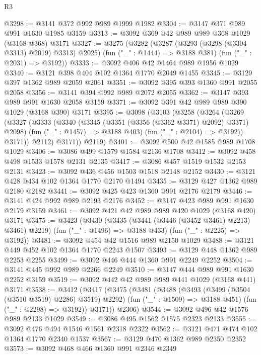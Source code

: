 \begin{lexlean}{R3}
\begin{coremodule}
@3298 := @3141 @372 @992 @989 @1999 @1982
@3304 := @3147 @371 @989 @991 @1630 @1985 @3159
@3313 := @3092 @369 @42 @989 @989 @368 @1029 (@3168 @368) @3171
@3327 := @3275
    (@3282
      (@3287 (@3293 (@3298 (@3304 @3313) @2019) @3313) @2025)
      (fun ("_" : @1444) => @3188 @381)
      (fun ("_" : @2031) => @3192))
@3333 := @3092 @406 @42 @1464 @989 @1956 @1029
@3340 := @3121 @398 @404 @102 @1364 @1770 @2049 @1455
@3345 := @3129 @397 @1362 @989 @2059 @2061
@3351 := @3092 @395 @393 @1360 @991 @2055 @2058
@3356 := @3141 @394 @992 @989 @2072 @2055
@3362 := @3147 @393 @989 @991 @1630 @2058 @3159
@3371 := @3092 @391 @42 @989 @989 @390 @1029 (@3168 @390) @3171
@3395 := @3098
    (@3103
      (@3258
        (@3264
          (@3269
            (@3327
              (@3333
                (@3340
                  (@3345 (@3351 (@3356 (@3362 @3371) @2092) @3371) @2098)
                  (fun ("_" : @1457) => @3188 @403)
                  (fun ("_" : @2104) => @3192))
                @3171))
            @2112)
          @3171))
      @2119)
@3401 := @3092 @500 @42 @1585 @989 @1708 @1029
@3406 := @3086 @499 @1579 @1584 @2136 @1708
@3412 := @3092 @458 @498 @1533 @1578 @2131 @2135
@3417 := @3086 @457 @1519 @1532 @2153 @2131
@3423 := @3092 @436 @456 @1503 @1518 @2148 @2152
@3430 := @3121 @428 @434 @102 @1364 @1770 @2170 @1494
@3435 := @3129 @427 @1362 @989 @2180 @2182
@3441 := @3092 @425 @423 @1360 @991 @2176 @2179
@3446 := @3141 @424 @992 @989 @2193 @2176
@3452 := @3147 @423 @989 @991 @1630 @2179 @3159
@3461 := @3092 @421 @42 @989 @989 @420 @1029 (@3168 @420) @3171
@3475 := @3423
    (@3430
      (@3435 (@3441 (@3446 (@3452 @3461) @2213) @3461) @2219)
      (fun ("_" : @1496) => @3188 @433)
      (fun ("_" : @2225) => @3192))
@3481 := @3092 @454 @42 @1516 @989 @2150 @1029
@3488 := @3121 @449 @452 @102 @1364 @1770 @2243 @1507
@3493 := @3129 @448 @1362 @989 @2253 @2255
@3499 := @3092 @446 @444 @1360 @991 @2249 @2252
@3504 := @3141 @445 @992 @989 @2266 @2249
@3510 := @3147 @444 @989 @991 @1630 @2252 @3159
@3519 := @3092 @442 @42 @989 @989 @441 @1029 (@3168 @441) @3171
@3538 := @3412
    (@3417
      (@3475
        (@3481
          (@3488
            (@3493 (@3499 (@3504 (@3510 @3519) @2286) @3519) @2292)
            (fun ("_" : @1509) => @3188 @451)
            (fun ("_" : @2298) => @3192))
          @3171))
      @2306)
@3544 := @3092 @496 @42 @1576 @989 @2133 @1029
@3549 := @3086 @495 @1562 @1575 @2323 @2133
@3555 := @3092 @476 @494 @1546 @1561 @2318 @2322
@3562 := @3121 @471 @474 @102 @1364 @1770 @2340 @1537
@3567 := @3129 @470 @1362 @989 @2350 @2352
@3573 := @3092 @468 @466 @1360 @991 @2346 @2349

\end{coremodule}
\end{lexlean}
